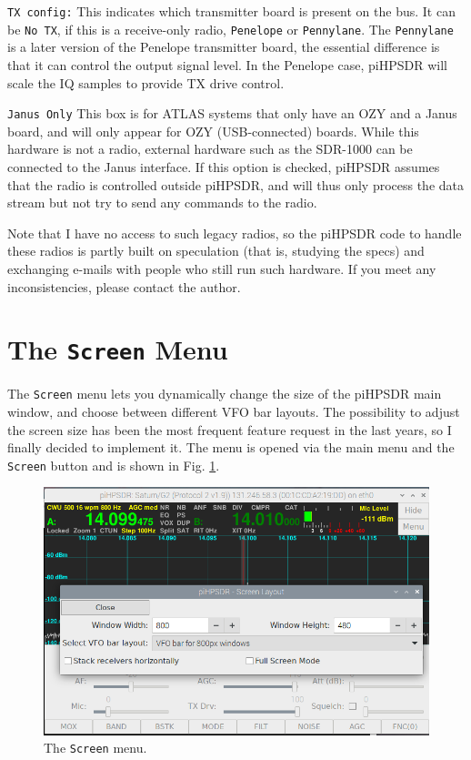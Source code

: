 \documentclass[12pt]{book}
\def\rett#1{\texttt{\color{red}#1}}
\def\bltt#1{\texttt{\color{blue}#1}}
\begin{document}
\rett{TX config:} This indicates which transmitter board is present on the bus. It can
be \texttt{No TX}, if this is a receive-only radio, \texttt{Penelope} or \texttt{Pennylane}.
The \texttt{Pennylane} is a later version of the Penelope transmitter board, the essential
difference is that it can control the output signal level. In the Penelope case,
piHPSDR will scale the IQ samples to provide TX drive control.

\rett{Janus Only} This box is for ATLAS systems that only have an OZY and a Janus board,
and will only appear for OZY (USB-connected) boards. While this hardware is not a radio,
external hardware such as the SDR-1000 can be connected to the Janus interface. If this
option is checked, piHPSDR assumes that the radio is controlled outside piHPSDR, and
will thus only process the data stream but not try to send any commands to the radio.

Note that I have no access to such legacy radios, so the piHPSDR code to handle these radios
is partly built on speculation (that is, studying the specs) and exchanging e-mails with
people who still run such hardware. If you meet any inconsistencies, please contact
the author.

\section{The \texttt{Screen} Menu}

The \bltt{Screen} menu lets you dynamically change the size of the piHPSDR main
window, and choose between different VFO bar layouts. The possibility to adjust
the screen size has been the most frequent feature request in the last years,
so I finally decided to implement it. The menu is opened
via the main menu and the \bltt{Screen} button and is shown in Fig. \ref{fig:ScreenMenu}.

\begin{figure}[ht]
\center
\includegraphics[width=12cm]{ScreenMenu.png}
\caption{The \bltt{Screen} menu.}
\label{fig:ScreenMenu}
\end{figure}
\end{document}
